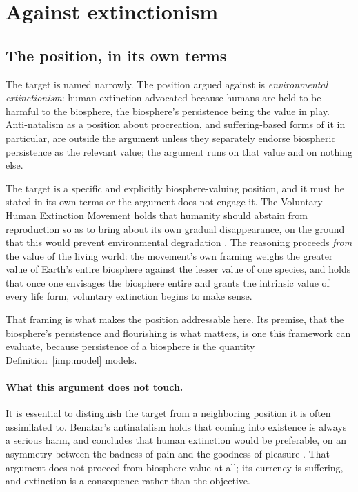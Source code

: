 \section{Against extinctionism}\label{sec:extinction}


\subsection{The position, in its own terms}

The target is named narrowly. The position argued against is
\emph{environmental extinctionism}: human extinction advocated because
humans are held to be harmful to the biosphere, the biosphere's
persistence being the value in play. Anti-natalism as a position about
procreation, and suffering-based forms of it in particular, are outside
the argument unless they separately endorse biospheric persistence as
the relevant value; the argument runs on that value and on nothing
else.\label{hr:subsub:position}

The target is a specific and explicitly biosphere-valuing position, and
it must be stated in its own terms or the argument does not engage it.
The Voluntary Human Extinction Movement holds that humanity should
abstain from reproduction so as to bring about its own gradual
disappearance, on the ground that this would prevent environmental
degradation \cite{VHEMT}. The reasoning proceeds \emph{from} the value
of the living world: the movement's own framing weighs the greater value
of Earth's entire biosphere against the lesser value of one species, and
holds that once one envisages the biosphere entire and grants the
intrinsic value of every life form, voluntary extinction begins to make
sense.

That framing is what makes the position addressable here. Its premise, that the biosphere's persistence and flourishing is what matters, is one this framework can evaluate, because persistence of a biosphere
is the quantity Definition~\ref{imp:model} models.

\paragraph{What this argument does not touch.}\label{hr:rem:scope}
It is essential to distinguish the target from a neighboring position
it is often assimilated to. Benatar's antinatalism holds that coming
into existence is always a serious harm, and concludes that human
extinction would be preferable, on an asymmetry between the badness of
pain and the goodness of pleasure \cite{Benatar06}. That argument does
not proceed from biosphere value at all; its currency is suffering, and
extinction is a consequence rather than the objective.

